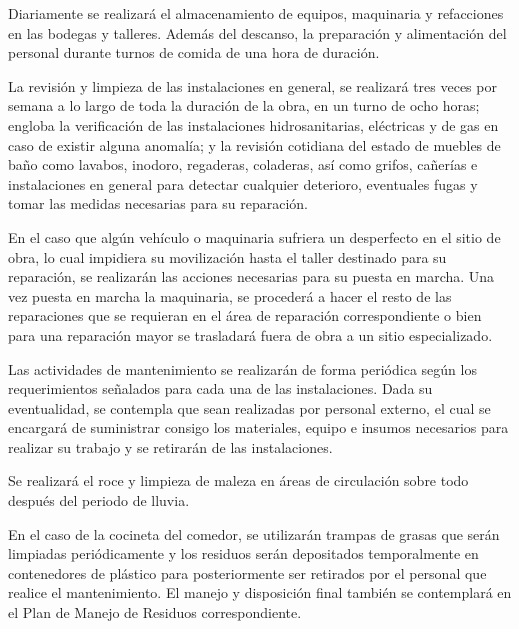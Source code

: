 \documentclass{article}
\begin{document}
\bigskip

Diariamente se realizará el almacenamiento de equipos, maquinaria y refacciones en las bodegas y talleres. Además del descanso, la preparación y alimentación del personal durante turnos de comida de una hora de duración. 

La revisión y limpieza de las instalaciones en general, se realizará tres veces por semana a lo largo de toda la duración de la obra, en un turno de ocho horas; engloba la verificación de las instalaciones hidrosanitarias, eléctricas y de gas en caso de existir alguna anomalía; y la revisión cotidiana del estado de muebles de baño como lavabos, inodoro, regaderas, coladeras, así como grifos, cañerías e instalaciones en general para detectar cualquier deterioro, eventuales fugas y tomar las medidas necesarias para su reparación. 

En el caso que algún vehículo o maquinaria sufriera un desperfecto en el sitio de obra, lo cual impidiera su movilización hasta el taller destinado para su reparación, se realizarán las acciones necesarias para su puesta en marcha. Una vez puesta en marcha la maquinaria, se procederá a hacer el resto de las reparaciones que se requieran en el área de reparación correspondiente o bien para una reparación mayor se trasladará fuera de obra a un sitio especializado.

Las actividades de mantenimiento se realizarán de forma periódica según los requerimientos señalados para cada una de las instalaciones. Dada su eventualidad, se contempla que sean realizadas por personal externo, el cual se encargará de suministrar consigo los materiales, equipo e insumos necesarios para realizar su trabajo y se retirarán de las instalaciones.

Se realizará el roce y limpieza de maleza en áreas de circulación sobre todo después del periodo de lluvia. 

En el caso de la cocineta del comedor, se utilizarán trampas de grasas que serán limpiadas periódicamente y los residuos serán depositados temporalmente en contenedores de plástico para posteriormente ser retirados por el personal que realice el mantenimiento. El manejo y disposición final también se contemplará en el Plan de Manejo de Residuos correspondiente.


\bigskip


\bigskip
\end{document}
